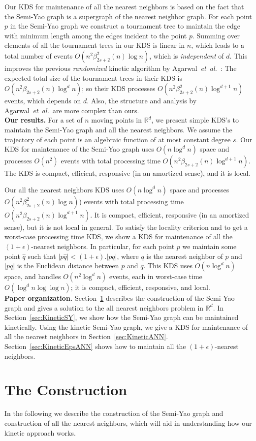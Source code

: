 \documentclass[11pt]{llncs}
\newcommand{\etal}{\emph{et~al.}}
\begin{document}
Our KDS for maintenance of all the nearest neighbors is based on the fact that the Semi-Yao graph is a supergraph of the nearest neighbor graph. For each point $p$ in the Semi-Yao graph we construct a tournament tree to maintain the edge with minimum length among the edges incident to the point $p$. Summing over elements of all the tournament trees in our KDS is linear in $n$, which leads to a total number of events $O(n^2\beta_{2s+2}^2(n)\log n)$, which is \textit{independent} of $d$. This improves the previous \textit{randomized} kinetic algorithm by Agarwal~\etal~\cite{Agarwal:2008:KDD:1435375.1435379}: The expected total size of the tournament trees in their KDS is $O(n^2\beta_{2s+2}(n)\log^dn)$; so their KDS processes $O(n^2\beta_{2s+2}^2(n)\log^{d+1} n)$ events, which depends on $d$. Also, the structure and analysis by Agarwal~\etal~are more complex than ours.
\vspace{+5pt}
\\
\textbf{Our results.}
For a set of $n$ moving points in $\mathbb{R}^d$, we present simple KDS's to maintain the Semi-Yao graph and all the nearest neighbors. We assume the trajectory of each point is an algebraic function of at most constant degree $s$. Our KDS for maintenance of the Semi-Yao graph uses $O(n\log^d n)$ space and processes $O(n^2)$ events with total processing time $O(n^2\beta_{2s+2}(n)\log^{d+1} n)$.  The KDS is compact, efficient, responsive (in an amortized sense), and it is local.


Our all the nearest neighbors KDS uses $O(n\log^d n)$ space and processes $O(n^2\beta_{2s+2}^2(n)\log n)$) events with total processing time $O(n^2\beta_{2s+2}(n)\log^{d+1} n)$.  It is compact, efficient, responsive (in an amortized sense), but it is not local in general. To satisfy the locality criterion and to get a worst-case processing time KDS, we show a KDS for maintenance of all the $(1+\epsilon)$-nearest neighbors. In particular, for each point $p$ we maintain some point $\hat{q}$ such that $|p\hat{q}|<(1+\epsilon).|pq|$, where $q$ is the nearest neighbor of $p$ and $|pq|$ is the Euclidean distance between $p$ and $q$. This KDS uses $O(n\log^{d} n)$ space, and handles $O(n^2\log^d n)$ events, each in worst-case time $O(\log^d n\log\log n)$; it is compact, efficient, responsive, and local.
\vspace{+5pt}
\\
\textbf{Paper organization.}
Section~\ref{sec:prelininary} describes the construction of the Semi-Yao graph and gives a solution to the all nearest neighbors problem in $\mathbb{R}^d$. In Section~\ref{sec:KineticSY}, we show how the Semi-Yao graph can be maintained kinetically. Using the kinetic Semi-Yao graph, we give a KDS for maintenance of all the nearest neighbors in Section~\ref{sec:KineticANN}. Section~\ref{sec:KineticEpsANN} shows how to maintain all the $(1+\epsilon)$-nearest neighbors.\section{The Construction}\label{sec:prelininary}
In the following we describe the construction of the Semi-Yao graph and construction of all the nearest neighbors, which will aid in understanding how our kinetic approach works.
\end{document}

